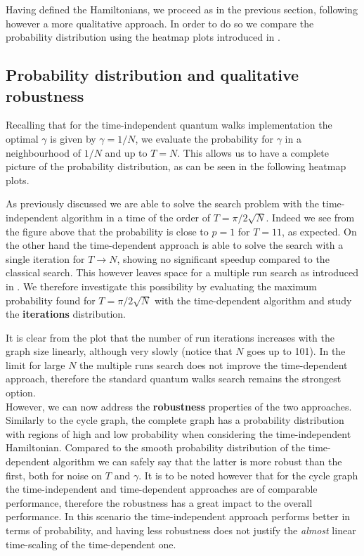     \noindent
    Having defined the Hamiltonians, we proceed as in the previous section, following however a more qualitative approach. In order to do so we compare the probability distribution using the heatmap plots introduced in .


    \subsection{Probability distribution and qualitative robustness}
    Recalling that for the time-independent quantum walks implementation the optimal $\gamma$ is given by $\gamma=1/N$, we evaluate the probability for $\gamma$ in a neighbourhood of $1/N$ and up to $T=N$. This allows us to have a complete picture of the probability distribution, as can be seen in the following heatmap plots.

    
    As previously discussed we are able to solve the search problem with the time-independent algorithm in a time of the order of $T=\pi/2\sqrt{N}$. Indeed we see from the figure above that the probability is close to $p=1$ for $T=11$, as expected. On the other hand the time-dependent approach is able to solve the search with a single iteration for $T\rightarrow N$, showing no significant speedup compared to the classical search. This however leaves space for a multiple run search as introduced in . We therefore investigate this possibility by evaluating the maximum probability found for $T=\pi/2\sqrt{N}$ with the time-dependent algorithm and study the \textbf{iterations} distribution.

    

    It is clear from the plot that the number of run iterations increases with the graph size linearly, although very slowly (notice that $N$ goes up to 101). In the limit for large $N$ the multiple runs search does not improve the time-dependent approach, therefore the standard quantum walks search remains the strongest option.
    \\


    \noindent
    However, we can now address the \textbf{robustness} properties of the two approaches. Similarly to the cycle graph, the complete graph has a probability distribution with regions of high and low probability when considering the time-independent Hamiltonian. Compared to the smooth probability distribution of the time-dependent algorithm we can safely say that the latter is more robust than the first, both for noise on $T$ and $\gamma$. It is to be noted however that for the cycle graph the time-independent and time-dependent approaches are of comparable performance, therefore the robustness has a great impact to the overall performance. In this scenario the time-independent approach performs better in terms of probability, and having less robustness does not justify the \textit{almost} linear time-scaling of the time-dependent one. \\


